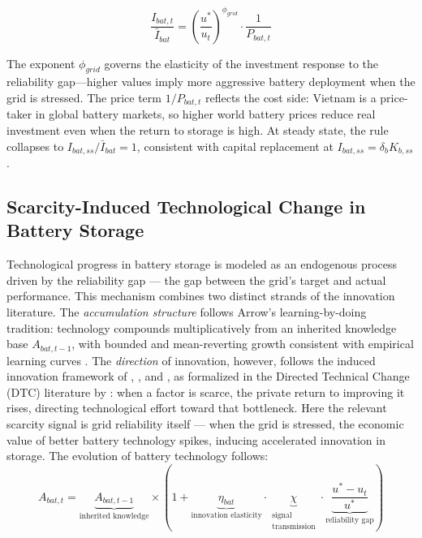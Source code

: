 \documentclass[12pt, a4paper]{article}
\begin{document}
\begin{equation}
\frac{I_{bat,t}}{\bar{I}_{bat}} = \left(\frac{u^*}{u_t}\right)^{\phi_{grid}} \cdot \frac{1}{P_{bat,t}}
\label{eq:battery_investment}
\end{equation}

The exponent $\phi_{grid}$ governs the elasticity of the investment response to the reliability gap---higher values imply more aggressive battery deployment when the grid is stressed. The price term $1/P_{bat,t}$ reflects the cost side: Vietnam is a price-taker in global battery markets, so higher world battery prices reduce real investment even when the return to storage is high. At steady state, the rule collapses to $I_{bat,ss}/\bar{I}_{bat} = 1$, consistent with capital replacement at $I_{bat,ss} = \delta_b K_{b,ss}$.

\subsection{Scarcity-Induced Technological Change in Battery Storage}

Technological progress in battery storage is modeled as an endogenous process driven by the reliability gap --- the gap between the grid's target and actual performance. This mechanism combines two distinct strands of the innovation literature. The \textit{accumulation structure} follows Arrow's \citeyearpar{arrow1962} learning-by-doing tradition: technology compounds multiplicatively from an inherited knowledge base $A_{bat,t-1}$, with bounded and mean-reverting growth consistent with empirical learning curves \citep{nemet2006, kittner2017}. The \textit{direction} of innovation, however, follows the induced innovation framework of \citet{hicks1932}, \citet{kennedy1964}, and \citet{drandakisphelps1966}, as formalized in the Directed Technical Change (DTC) literature by \citet{acemoglu2002}: when a factor is scarce, the private return to improving it rises, directing technological effort toward that bottleneck. Here the relevant scarcity signal is grid reliability itself --- when the grid is stressed, the economic value of better battery technology spikes, inducing accelerated innovation in storage. The evolution of battery technology follows:
\begin{equation}
A_{bat,t} = \underbrace{A_{bat,t-1}}_{\text{inherited knowledge}} \times \left(1 + \underbrace{\eta_{bat}}_{\text{innovation elasticity}} \cdot \underbrace{\chi}_{\substack{\text{signal}\\\text{transmission}}} \cdot \underbrace{\frac{u^* - u_t}{u^*}}_{\text{reliability gap}}\right)
\label{eq:learning_by_doing}
\end{equation}
\end{document}
